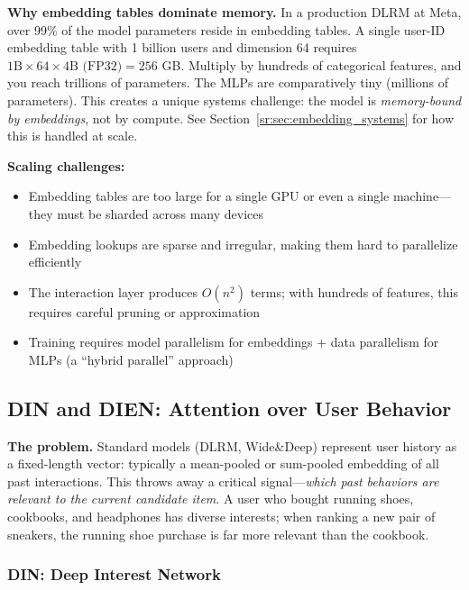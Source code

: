 \textbf{Why embedding tables dominate memory.} In a production DLRM at Meta, over 99\% of the model parameters reside in embedding tables. A single user-ID embedding table with 1 billion users and dimension 64 requires $1\text{B} \times 64 \times 4\text{B (FP32)} = 256$ GB. Multiply by hundreds of categorical features, and you reach trillions of parameters. The MLPs are comparatively tiny (millions of parameters). This creates a unique systems challenge: the model is \textit{memory-bound by embeddings}, not by compute. See Section~\ref{sr:sec:embedding_systems} for how this is handled at scale.

\textbf{Scaling challenges:}
\begin{itemize}
    \item Embedding tables are too large for a single GPU or even a single machine---they must be sharded across many devices
    \item Embedding lookups are sparse and irregular, making them hard to parallelize efficiently
    \item The interaction layer produces $O(n^2)$ terms; with hundreds of features, this requires careful pruning or approximation
    \item Training requires model parallelism for embeddings + data parallelism for MLPs (a ``hybrid parallel'' approach)
\end{itemize}

\subsection{DIN and DIEN: Attention over User Behavior}
\label{sr:sec:din_dien}

\textbf{The problem.} Standard models (DLRM, Wide\&Deep) represent user history as a fixed-length vector: typically a mean-pooled or sum-pooled embedding of all past interactions. This throws away a critical signal---\textit{which past behaviors are relevant to the current candidate item}. A user who bought running shoes, cookbooks, and headphones has diverse interests; when ranking a new pair of sneakers, the running shoe purchase is far more relevant than the cookbook.

\subsubsection{DIN: Deep Interest Network}

